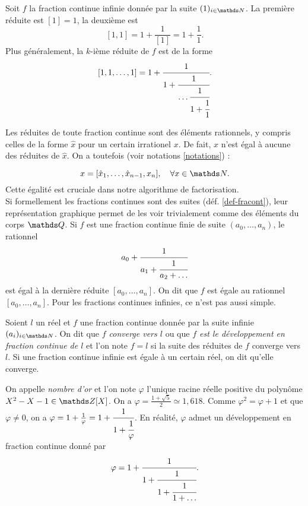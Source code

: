 \begin{exemple}
	Soit $f$ la fraction continue infinie donnée par la suite $(1)_{i\in \N}$.
	La première réduite est $[1] = 1$, la deuxième est \[[1, 1] = 1 +
	\frac{1}{[1]} = 1 + \frac{1}{1}.\] Plus généralement, la $k$-ième réduite
	de $f$ est de la forme \[[1, 1, \dots, 1] = 1 + \cfrac{1}{1 +
	\cfrac{1}{\dots \\ \cfrac{1}{1 + \cfrac{1}{1}}}}.\]
\end{exemple}

Les réduites de toute fraction continue sont des éléments rationnels, y compris
celles de la forme $\hat{x}$ pour un certain irrationel $x$. De fait, $x$ n'est
égal à aucune des réduites de $\hat{x}$. On a toutefois (voir notations
\ref{notations}) :

\begin{equation} \label{egalite-reduite}
	x = [\hat{x}_1, \dots, \hat{x}_{n-1}, x_n], \quad \forall x\in \N.
\end{equation}
Cette égalité est cruciale dans notre algorithme de factorisation. \\

Si formellement les fractions continues sont des suites (déf.
\ref{def-fracont}), leur représentation graphique permet de les voir
trivialement comme des éléments du corps $\Q$. Si $f$ est une fraction continue
finie de suite $(a_0, \dots, a_n)$, le rationnel \[a_0 + \cfrac{1}{a_1 +
\cfrac{1}{a_2 + \dots}}\] est égal à la dernière réduite $[a_0, \dots, a_n]$.
On dit que $f$ est égale au rationnel $[a_0, \dots, a_n]$. Pour les fractions
continues infinies, ce n'est pas aussi simple.

\begin{definition}
	Soient $l$ un réel et $f$ une fraction continue donnée par la suite infinie
	$(a_i)_{i\in \N}$. On dit que \emph{$f$ converge vers $l$} ou que \emph{$f$
	est le développement en fraction continue de $l$} et l'on note $f = l$ si
	la suite des réduites de $f$ converge vers $l$. Si une fraction continue
	infinie est égale à un certain réel, on dit qu'elle converge.
\end{definition}

\begin{exemple}[Nombre d'or]
	On appelle \emph{nombre d'or} et l'on note $\varphi$ l'unique racine réelle
	positive du polynôme $X^2 - X - 1 \in \Z[X]$. On a $\varphi =\frac{1 +
	\sqrt{5}}{2} \simeq 1, 618$. Comme $\varphi^2 = \varphi + 1$ et que
	$\varphi \neq 0$, on a $\varphi = 1 + \frac{1}{\varphi} = 1 + \cfrac{1}{1 +
	\cfrac{1}{\varphi}}$. En réalité, $\varphi$ admet un développement en
	fraction continue donné par \[\varphi = 1 + \cfrac{1}{1 + \cfrac{1}{1 +
	\cfrac{1}{1 + \dots}}}.\]
\end{exemple}

